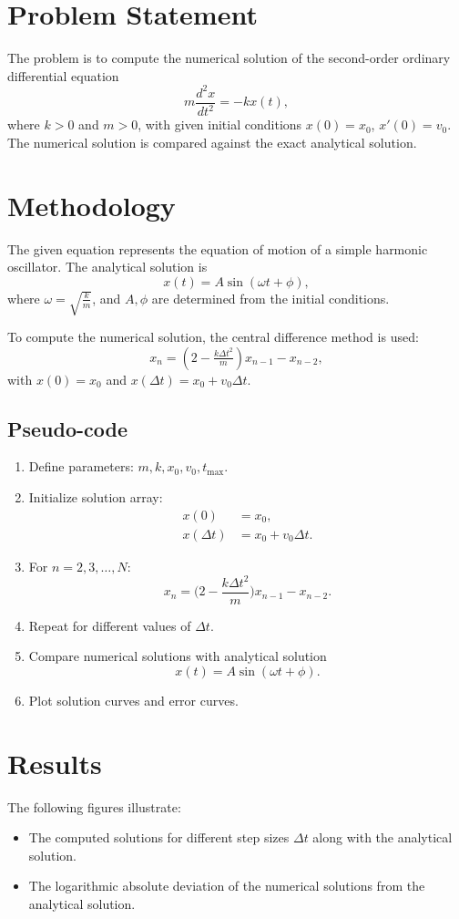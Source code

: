 \section*{Problem Statement}
The problem is to compute the numerical solution of the second-order ordinary differential equation
\[
    m \frac{d^2x}{dt^2} = -k x(t),
\]
where $k > 0$ and $m > 0$, with given initial conditions $x(0) = x_0$, $x'(0) = v_0$. The numerical solution is compared against the exact analytical solution.

\section*{Methodology}
The given equation represents the equation of motion of a simple harmonic oscillator. The analytical solution is
\[
    x(t) = A \sin(\omega t + \phi),
\]
where $\omega = \sqrt{\tfrac{k}{m}}$, and $A, \phi$ are determined from the initial conditions.

To compute the numerical solution, the central difference method is used:
\[
    x_{n} = (2 - \tfrac{k \Delta t^2}{m}) x_{n-1} - x_{n-2},
\]
with $x(0) = x_0$ and $x(\Delta t) = x_0 + v_0 \Delta t$.

\subsection*{Pseudo-code}
\begin{enumerate}
    \item Define parameters: $m, k, x_0, v_0, t_{\max}$.
    \item Initialize solution array:
    \begin{align*}
        x(0) &= x_0, \\
        x(\Delta t) &= x_0 + v_0 \Delta t.
    \end{align*}
    \item For $n = 2,3,\dots,N$:
    \[
        x_n = \bigg(2 - \frac{k \Delta t^2}{m}\bigg)x_{n-1} - x_{n-2}.
    \]
    \item Repeat for different values of $\Delta t$.
    \item Compare numerical solutions with analytical solution
    \[
        x(t) = A \sin(\omega t + \phi).
    \]
    \item Plot solution curves and error curves.
\end{enumerate}

\section*{Results}
The following figures illustrate:
\begin{itemize}
    \item The computed solutions for different step sizes $\Delta t$ along with the analytical solution.
    \item The logarithmic absolute deviation of the numerical solutions from the analytical solution.
\end{itemize}

